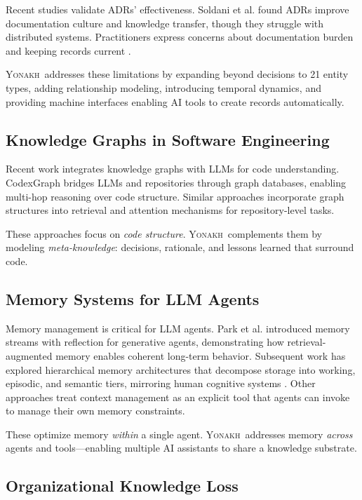 \documentclass[10pt,journal,compsoc]{IEEEtran}
\newcommand{\yonakh}{\textsc{Yonakh}}
\begin{document}
Recent studies validate ADRs' effectiveness. Soldani et al. \cite{soldani2024adr} found ADRs improve documentation culture and knowledge transfer, though they struggle with distributed systems. Practitioners express concerns about documentation burden and keeping records current \cite{tofan2023adr,zimmermann2015architectural}.

\yonakh\ addresses these limitations by expanding beyond decisions to 21 entity types, adding relationship modeling, introducing temporal dynamics, and providing machine interfaces enabling AI tools to create records automatically.

\subsection{Knowledge Graphs in Software Engineering}

Recent work integrates knowledge graphs with LLMs for code understanding. CodexGraph \cite{liu2024codexgraph} bridges LLMs and repositories through graph databases, enabling multi-hop reasoning over code structure. Similar approaches incorporate graph structures into retrieval and attention mechanisms for repository-level tasks.

These approaches focus on \emph{code structure}. \yonakh\ complements them by modeling \emph{meta-knowledge}: decisions, rationale, and lessons learned that surround code.

\subsection{Memory Systems for LLM Agents}

Memory management is critical for LLM agents. Park et al. \cite{park2023generative} introduced memory streams with reflection for generative agents, demonstrating how retrieval-augmented memory enables coherent long-term behavior. Subsequent work has explored hierarchical memory architectures that decompose storage into working, episodic, and semantic tiers, mirroring human cognitive systems \cite{baddeley2012working}. Other approaches treat context management as an explicit tool that agents can invoke to manage their own memory constraints.

These optimize memory \emph{within} a single agent. \yonakh\ addresses memory \emph{across} agents and tools---enabling multiple AI assistants to share a knowledge substrate.

\subsection{Organizational Knowledge Loss}
\end{document}
